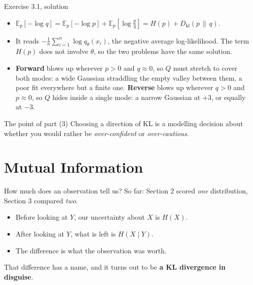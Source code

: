 \documentclass[aspectratio=169,9pt]{beamer}
\newcommand{\orange}[1]{\textcolor{AmazonOrange}{\textbf{#1}}}
\newcommand{\KL}[2]{D_{\mathrm{kl}}\!\left(#1 \,\|\, #2\right)}
\newcommand{\E}{\mathbb{E}}
\begin{document}
\begin{frame}{Exercise 3.1, solution}
\begin{itemize}
    \item[(1)] $\E_p[-\log q] = \E_p[-\log p] + \E_p\!\left[\log \frac{p}{q}\right] = H(p) + \KL{p}{q}$.
    \pause
    \item[(2)] It reads $-\frac{1}{n}\sum_{i=1}^n \log q_\theta(x_i)$, the negative average log-likelihood.
    The term $H(p)$ does not involve $\theta$, so the two problems have the same solution.
    \pause
    \item[(3)] \orange{Forward} blows up wherever $p > 0$ and $q \approx 0$, so $Q$ must stretch to cover both
    modes: a wide Gaussian straddling the empty valley between them, a poor fit everywhere but a finite one.
    \orange{Reverse} blows up wherever $q > 0$ and $p \approx 0$, so $Q$ hides inside a single mode: a narrow
    Gaussian at $+3$, or equally at $-3$.
\end{itemize}
\vspace{0.2cm}
\pause
\begin{alertblock}{The point of part (3)}
Choosing a direction of KL is a modelling decision about whether you would rather be \textit{over-confident}
or \textit{over-cautious}.
\end{alertblock}
\end{frame}

\section{Mutual Information}

\begin{frame}{How much does an observation tell us?}
So far: Section 2 scored \textit{one} distribution, Section 3 compared \textit{two}.
\pause
\vspace{0.25cm}
\begin{itemize}
    \item Before looking at $Y$, our uncertainty about $X$ is $H(X)$.
    \pause
    \item After looking at $Y$, what is left is $H(X \mid Y)$.
    \pause
    \item The difference is what the observation was worth.
\end{itemize}
\vspace{0.3cm}
\pause
\begin{center}
\large That difference has a name, and it turns out to be \orange{a KL divergence in disguise}.
\end{center}
\end{frame}
\end{document}
